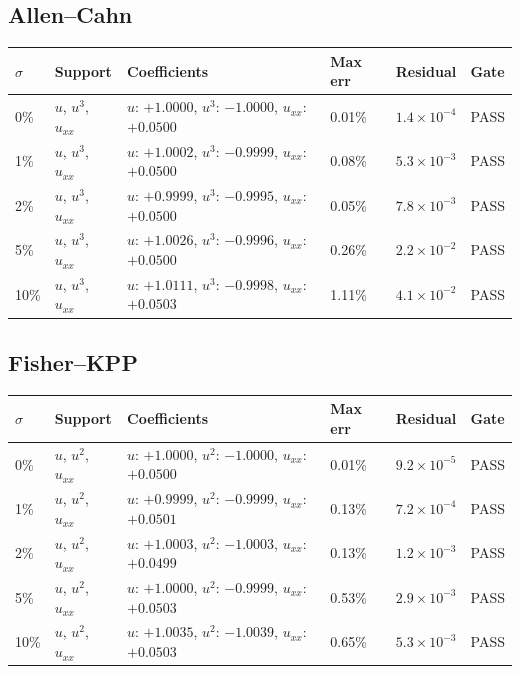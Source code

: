 \documentclass[11pt]{article}
\begin{document}
\subsection*{Allen–Cahn}
\begin{center}\small\begin{tabular}{llp{5.2cm}lll}
\toprule
$\sigma$ & Support & Coefficients & Max err & Residual & Gate \\
\midrule
0\% & $u$, $u^3$, $u_{xx}$ & $u$: $+1.0000$, $u^3$: $-1.0000$, $u_{xx}$: $+0.0500$ & 0.01\% & $1.4 \times 10^{-4}$ & PASS \\
1\% & $u$, $u^3$, $u_{xx}$ & $u$: $+1.0002$, $u^3$: $-0.9999$, $u_{xx}$: $+0.0500$ & 0.08\% & $5.3 \times 10^{-3}$ & PASS \\
2\% & $u$, $u^3$, $u_{xx}$ & $u$: $+0.9999$, $u^3$: $-0.9995$, $u_{xx}$: $+0.0500$ & 0.05\% & $7.8 \times 10^{-3}$ & PASS \\
5\% & $u$, $u^3$, $u_{xx}$ & $u$: $+1.0026$, $u^3$: $-0.9996$, $u_{xx}$: $+0.0500$ & 0.26\% & $2.2 \times 10^{-2}$ & PASS \\
10\% & $u$, $u^3$, $u_{xx}$ & $u$: $+1.0111$, $u^3$: $-0.9998$, $u_{xx}$: $+0.0503$ & 1.11\% & $4.1 \times 10^{-2}$ & PASS \\
\bottomrule
\end{tabular}\end{center}

\subsection*{Fisher–KPP}
\begin{center}\small\begin{tabular}{llp{5.2cm}lll}
\toprule
$\sigma$ & Support & Coefficients & Max err & Residual & Gate \\
\midrule
0\% & $u$, $u^2$, $u_{xx}$ & $u$: $+1.0000$, $u^2$: $-1.0000$, $u_{xx}$: $+0.0500$ & 0.01\% & $9.2 \times 10^{-5}$ & PASS \\
1\% & $u$, $u^2$, $u_{xx}$ & $u$: $+0.9999$, $u^2$: $-0.9999$, $u_{xx}$: $+0.0501$ & 0.13\% & $7.2 \times 10^{-4}$ & PASS \\
2\% & $u$, $u^2$, $u_{xx}$ & $u$: $+1.0003$, $u^2$: $-1.0003$, $u_{xx}$: $+0.0499$ & 0.13\% & $1.2 \times 10^{-3}$ & PASS \\
5\% & $u$, $u^2$, $u_{xx}$ & $u$: $+1.0000$, $u^2$: $-0.9999$, $u_{xx}$: $+0.0503$ & 0.53\% & $2.9 \times 10^{-3}$ & PASS \\
10\% & $u$, $u^2$, $u_{xx}$ & $u$: $+1.0035$, $u^2$: $-1.0039$, $u_{xx}$: $+0.0503$ & 0.65\% & $5.3 \times 10^{-3}$ & PASS \\
\bottomrule
\end{tabular}\end{center}
\end{document}
